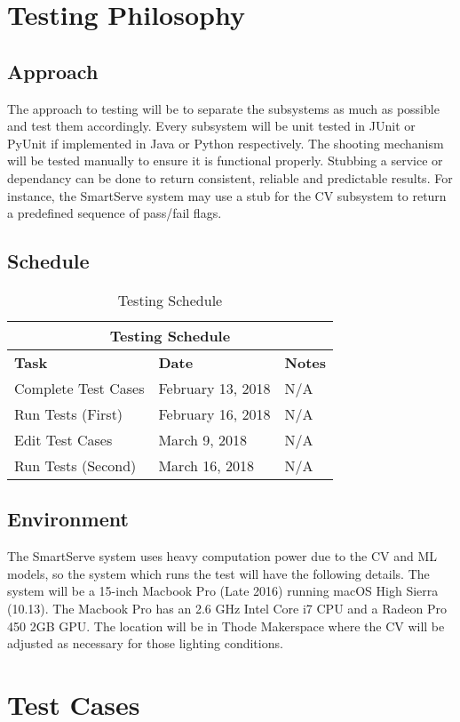 \documentclass[11pt]{article}
\begin{document}
\section{Testing Philosophy}
\subsection{Approach}
The approach to testing will be to separate the subsystems as much as possible and test them accordingly. Every subsystem will be unit tested in JUnit or PyUnit if implemented in Java or Python respectively. The shooting mechanism will be tested manually to ensure it is functional properly. Stubbing a service or dependancy can be done to return consistent, reliable and predictable results. For instance, the SmartServe system may use a stub for the CV subsystem to return a predefined sequence of pass/fail flags.
\subsection{Schedule}
\begin{table}[H]
\centering
\caption{Testing Schedule}
\label{my-label}
\begin{tabular}{|l|l|l|}
\hline
\multicolumn{3}{|c|}{\textbf{Testing Schedule}}  \\ \hline 
\textbf{Task} & \textbf{Date} & \textbf{Notes} \\ \hline
Complete Test Cases & February 13, 2018 & N/A \\ \hline
Run Tests (First) & February 16, 2018 & N/A \\ \hline
Edit Test Cases & March 9, 2018 & N/A \\ \hline
Run Tests (Second) & March 16, 2018 & N/A \\ \hline
\end{tabular}
\end{table}
\subsection{Environment}
The SmartServe system uses heavy computation power due to the CV and ML models, so the system which runs the test will have the following details. The system will be a 15-inch Macbook Pro (Late 2016) running macOS High Sierra (10.13). The Macbook Pro has an 2.6 GHz Intel Core i7 CPU and a Radeon Pro 450 2GB GPU. The location will be in Thode Makerspace where the CV will be adjusted as necessary for those lighting conditions.
\section{Test Cases}
\end{document}
